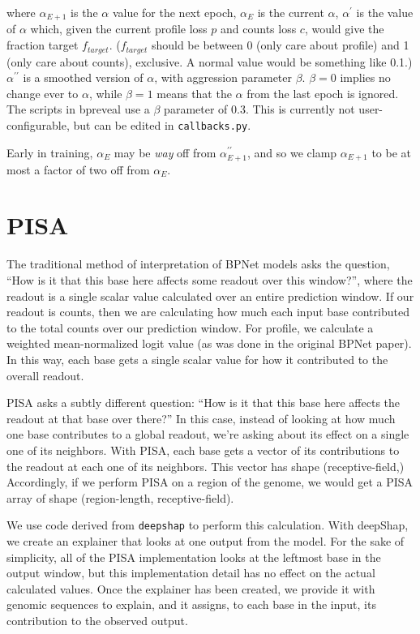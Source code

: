 \documentclass{article}
\begin{document}
where $\alpha_{E+1}$ is the $\alpha$ value for the next epoch, $\alpha_E$ is the current $\alpha$,
$\alpha^{\prime}$ is the value of $\alpha$ which, given the current
profile loss $p$ and counts loss $c$, would give the fraction target $f_{target}$.
($f_{target}$ should be between 0 (only care about profile) and 1 (only care about counts),
exclusive. A normal value would be something like 0.1.)
$\alpha^{\prime\prime}$ is a smoothed version of $\alpha$, with 
aggression parameter $\beta$. $\beta=0$ implies no change ever to $\alpha$,
while $\beta = 1$ means that the $\alpha$ from the last epoch is ignored.
The scripts in bpreveal use a $\beta$ parameter of 0.3. This is currently not user-configurable,
but can be edited in \texttt{callbacks.py}.

Early in training, $\alpha_E$ may be \emph{way} off from $\alpha^{\prime\prime}_{E+1}$, and
so we clamp $\alpha_{E+1}$ to be at most a factor of two off from $\alpha_E$.

\section{PISA}\label{sec:pisa}
The traditional method of interpretation of BPNet models asks the question,
``How is it that this base here affects some readout over this window?'',
where the readout is a single scalar value calculated over an entire prediction window.
If our readout is counts, then we are calculating how much each input base contributed to the
total counts over our prediction window. For profile, we calculate a weighted mean-normalized
logit value (as was done in the original BPNet paper). In this way, each base gets a single scalar
value for how it contributed to the overall readout.

PISA asks a subtly different question:
``How is it that this base here affects the readout at that base over there?''
In this case, instead of looking at how much one base contributes to a global readout, we're
asking about its effect on a single one of its neighbors. With PISA, each base gets a vector of
its contributions to the readout at each one of its neighbors.
This vector has shape (receptive-field,)
Accordingly, if we perform PISA on a region of the genome, we would get a PISA array of shape
(region-length, receptive-field).

We use code derived from \texttt{deepshap} to perform this calculation. With deepShap, we create
an explainer that looks at one output from the model. For the sake of simplicity, all of the PISA
implementation looks at the leftmost base in the output window, but this implementation detail
has no effect on the actual calculated values.
Once the explainer has been created, we provide it with genomic sequences to explain, and it
assigns, to each base in the input, its contribution to the observed output.
\end{document}
